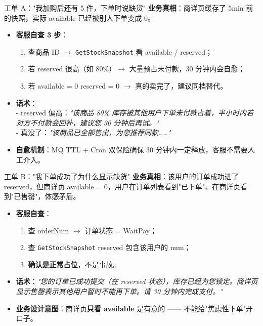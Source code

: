 \documentclass[aspectratio=169,11pt]{beamer}
\begin{document}
\begin{frame}[shrink]{工单 A："我加购后还有 5 件，下单时说缺货"}
\textbf{业务真相}：商详页缓存了 5min 前的快照，实际 available 已经被别人下单变成 0。
\vspace{1mm}
\begin{itemize}
  \item \textbf{客服自查 3 步}：
  \begin{enumerate}
    \item 查商品 ID $\to$ \texttt{GetStockSnapshot} 看 available / reserved；
    \item 若 reserved 很高（如 80\%）$\to$ 大量预占未付款，30 分钟内会自愈；
    \item 若 available = 0 reserved = 0 $\to$ 真的卖完了，建议同档替代。
  \end{enumerate}
  \item \textbf{话术}：\\
  \quad - reserved 偏高：\textit{"该商品 80\% 库存被其他用户下单未付款占着，半小时内若对方不付款会回补，建议您 30 分钟后再试。"}\\
  \quad - 真没了：\textit{"该商品已全部售出，为您推荐同款……"}
  \item \textbf{自愈机制}：MQ TTL + Cron 双保险确保 30 分钟内一定释放，客服不需要人工介入。
\end{itemize}
\end{frame}

\begin{frame}[shrink]{工单 B："我下单成功了为什么显示缺货"}
\textbf{业务真相}：该用户的订单成功进了 reserved，但商详页 available = 0，用户在订单列表看到"已下单"、在商详页看到"已售罄"，体感矛盾。
\vspace{1mm}
\begin{itemize}
  \item \textbf{客服自查}：
  \begin{enumerate}
    \item 查 orderNum $\to$ 订单状态 = WaitPay；
    \item 查 \texttt{GetStockSnapshot} reserved 包含该用户的 num；
    \item \textbf{确认是正常占位}，不是事故。
  \end{enumerate}
  \item \textbf{话术}：\textit{"您的订单已成功提交（在 reserved 状态），库存已经为您锁定。商详页显示售罄表示其他用户暂时不能再下单。请 30 分钟内完成支付。"}
  \item \textbf{业务设计意图}：商详页\textbf{只看 available} 是有意的 —— 不能给"焦虑性下单"开口子。
\end{itemize}
\end{frame}
\end{document}
